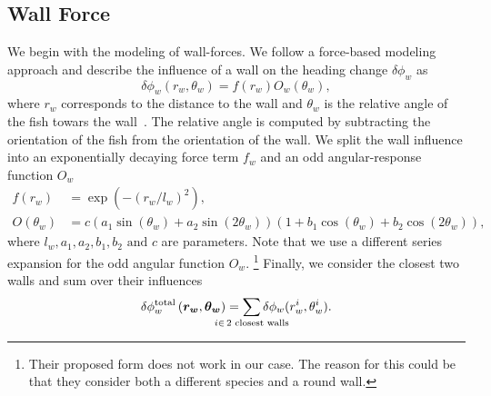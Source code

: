 \documentclass[nobib, a4paper]{tufte-handout}
\begin{document}
\subsection{Wall Force}
We begin with the modeling of wall-forces.
We follow a force-based modeling approach and describe the influence of a wall on the heading change \(\delta \phi_w\) as
\begin{equation*}
  \delta \phi_w (r_w, \theta_w) = f(r_w)O_w(\theta_w),
\end{equation*}
where $r_w$ corresponds to the distance to the wall and $\theta_w$ is the relative angle of the fish towars the wall~\autocite{calovi}.
The relative angle is computed by subtracting the orientation of the fish from the orientation of the wall.
We split the wall influence into an exponentially decaying force term \(f_w\) and an odd angular-response function \(O_w\)
\begin{align*}
  f(r_w) &= \exp \left( -{(r_w/l_w)}^2 \right), \\
  O(\theta_w) &= c \left(a_1 \sin(\theta_w) + a_2 \sin(2  \theta_w)  \right)  \left(1 +  b_1  \cos(\theta_w) + b_2 \cos(2  \theta_w) \right),
\end{align*}
where $l_w, a_1, a_2, b_1, b_2 \text{ and } c$ are parameters.
Note that we use a different series expansion for the odd angular function \(O_w\).%
\footnote{Their proposed form does not work in our case.
  The reason for this could be that they consider both a different species and a round wall.}
Finally, we consider the closest two walls and sum over their influences
\begin{equation*}
 \delta \phi_w^{\text{total}} \left( \bm{r_w}, \bm{\theta_w} \right) = \sum_{\mathclap{i \in \, 2 \text{ closest walls}}} \delta \phi_w (r_w^i, \theta_w^i).
\end{equation*}
\end{document}
